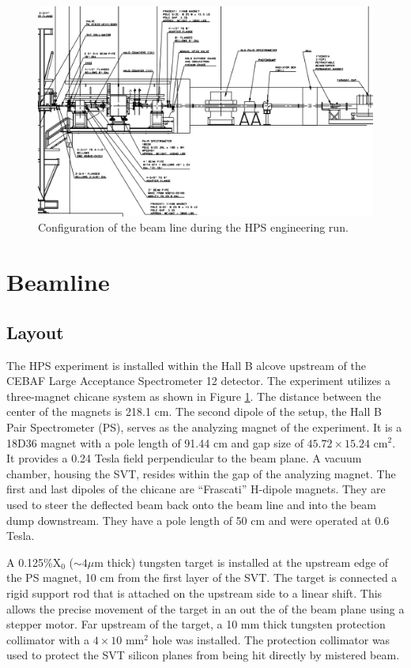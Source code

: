\begin{figure}
    \centering
    \includegraphics[width=\textwidth]{images/beamline.png}
    \caption{Configuration of the beam line during the HPS engineering run.}
    \label{fig:beamline}
\end{figure}

\section{Beamline}

\subsection{Layout}

The HPS experiment is installed within the Hall B alcove upstream of the CEBAF
Large Acceptance Spectrometer 12 detector.  The experiment utilizes a 
three-magnet chicane system as shown in Figure \ref{fig:beamline}. The distance
between the center of the magnets is 218.1 cm. The second 
dipole of the setup, the Hall B Pair Spectrometer (PS), serves as the analyzing 
magnet of the experiment.  It is a 18D36 magnet with a pole length of 91.44 cm
and gap size of $45.72 \times 15.24 \text{ cm}^2$.  It provides a 0.24 Tesla
field perpendicular to the beam plane. A vacuum chamber, housing the SVT, resides 
within the gap of the analyzing magnet. The first and last dipoles of the 
chicane are ``Frascati'' H-dipole magnets.
They are used to steer the deflected beam back onto the beam line and into the
beam dump downstream.  
They have a pole length of 50 cm and were operated at 0.6 Tesla.

A 0.125\%X$_{0}$ ($\sim 4\mu$m thick) tungsten target is installed at the
upstream edge of the 
PS magnet, 10 cm from the first layer of the SVT.
The target is connected a rigid support rod that is attached on the upstream 
side to a linear shift.  This allows the precise movement of the target
in an out the of the beam plane using a stepper motor.  Far upstream of the target, a 10 mm
thick tungsten protection collimator with a $4\times 10 \text{ mm}^2$ hole
was installed. The protection collimator was used to protect the SVT
silicon planes from being hit directly by mistered beam.

